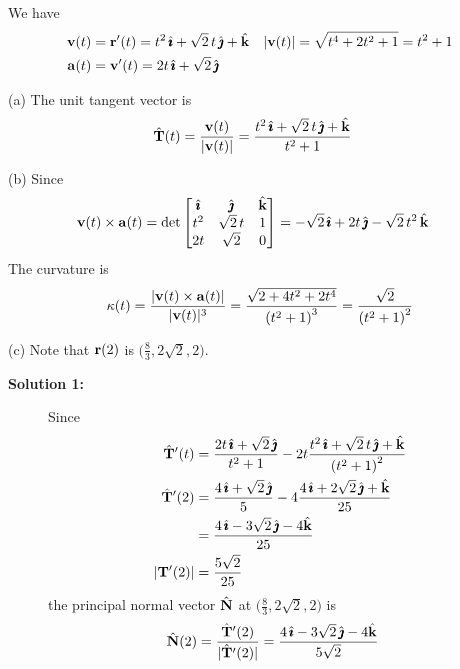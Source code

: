 \begin{solution} 
We have
\begin{align*}
\mathbf{v}(t)&=\mathbf{r}'(t) = t^2\,\hat{\pmb{\imath}} +\sqrt{2}\,t\,\hat{\pmb{\jmath}} +\hat{\mathbf{k}} &
|\mathbf{v}(t)|&=\sqrt{t^4+2t^2+1}=t^2+1
\\
\mathbf{a}(t)&=\mathbf{v}'(t) = 2t\,\hat{\pmb{\imath}} +\sqrt{2}\,\hat{\pmb{\jmath}}
\end{align*}

(a)
The unit tangent vector  is
\begin{align*}
\hat{\mathbf{T}}(t) &= \frac{\mathbf{v}(t)}{|\mathbf{v}(t)|} 
            = \frac{t^2\,\hat{\pmb{\imath}} +\sqrt{2}\,t\,\hat{\pmb{\jmath}} +\hat{\mathbf{k}}}{t^2+1}
\end{align*}

(b)
Since
\begin{align*}
\mathbf{v}(t)\times\mathbf{a}(t)&= \det\left[\begin{matrix}
           \hat{\pmb{\imath}} &  \hat{\pmb{\jmath}} & \hat{\mathbf{k}} \\
           t^2   &   \sqrt{2}\,t  & 1 \\
           2t    &   \sqrt{2}     & 0
\end{matrix}\right]
=-\sqrt{2}\,\hat{\pmb{\imath}} +2t\,\hat{\pmb{\jmath}}-\sqrt{2}\,t^2\,\hat{\mathbf{k}}
\end{align*}
The curvature is
\begin{align*}
\kappa(t) = \frac{|\mathbf{v}(t)\times\mathbf{a}(t)|}{|\mathbf{v}(t)|^3}
=\frac{\sqrt{2+4t^2+2t^4}} {{(t^2+1)}^3}
=\frac{\sqrt{2}} {{(t^2+1)}^2}
\end{align*}

(c)
Note that $\mathbf{r}(2)$ is $\big(\frac{8}{3} , 2\sqrt{2}, 2\big)$. 
\begin{description}
\item[\textbf{Solution 1:}]
Since
\begin{align*}
\hat{\mathbf{T}}'(t) & = \frac{2t\,\hat{\pmb{\imath}} +\sqrt{2}\,\hat{\pmb{\jmath}}}{t^2+1}
               -2t\frac{t^2\,\hat{\pmb{\imath}} +\sqrt{2}\,t\,\hat{\pmb{\jmath}} +\hat{\mathbf{k}}}{{(t^2+1)}^2} \\
\hat{\mathbf{T}}'(2) & = \frac{4\,\hat{\pmb{\imath}} +\sqrt{2}\,\hat{\pmb{\jmath}}}{5}
               -4\frac{4\,\hat{\pmb{\imath}} +2\sqrt{2}\,\hat{\pmb{\jmath}} +\hat{\mathbf{k}}}{25} \\
            &=\frac{4\,\hat{\pmb{\imath}} -3\sqrt{2}\,\hat{\pmb{\jmath}} -4\hat{\mathbf{k}}}{25} \\
|\mathbf{T}'(2)|&=\frac{5\sqrt{2}}{25}
\end{align*}
the principal normal vector $\hat{\mathbf{N}}$ at $\big(\frac{8}{3} , 2\sqrt{2}, 2\big)$ is
\begin{align*}
\hat{\mathbf{N}}(2) &=\frac{\hat{\mathbf{T}}'(2)}{|\hat{\mathbf{T}}'(2)|}
           =\frac{4\,\hat{\pmb{\imath}} -3\sqrt{2}\,\hat{\pmb{\jmath}} -4\hat{\mathbf{k}}}{5\sqrt{2}}
\end{align*}


\end{description}
\end{solution}
